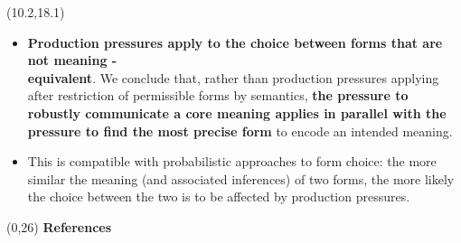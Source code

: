 \documentclass[a0,portrait]{a0poster}
\newcommand{\superlightgray}[1]{\textcolor{superlightgray}{#1}}
\def\LHead#1{\noindent{\LARGE\color{myBlue} #1}}
\begin{document}


\begin{textblock}{4.45}(10.2,18.1)
  \LHead{Conclusion}

\large
	\begin{itemize}
		\item \large \textbf{Production pressures apply to the choice between forms that are not meaning - \\equivalent}. We conclude that, rather than production pressures applying after restriction of permissible forms by semantics, \textbf{the pressure to robustly communicate a core meaning applies in parallel with the pressure to find the most precise form} to encode an intended meaning.
		\item \large  This is compatible with probabilistic approaches to form choice: the more similar the meaning (and associated inferences) of two forms, the more likely the choice between the two is to be affected by production pressures.
	\end{itemize}

\end{textblock} 



\renewcommand{\refname}{\normalsize References}

\begin{textblock}{15}(0,26)
\small
\textbf{References}
\end{textblock}
\end{document}
